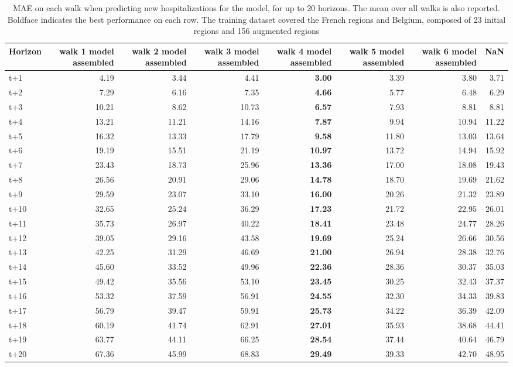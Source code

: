 \begin{table}[H]
\centering
\caption{MAE on each walk when predicting new hospitalizations for the model, for up to 20 horizons. The mean over all walks is also reported. Boldface indicates the best performance on each row. The training dataset covered the French regions and Belgium, composed of 23 initial regions and 156 augmented regions }
\label{tab:MAE_walk_assembly}
\begin{tabular}{lrrrrrrr}
\toprule
Horizon &  walk 1 model assembled &  walk 2 model assembled &  walk 3 model assembled &  walk 4 model assembled &  walk 5 model assembled &  walk 6 model assembled &   NaN \\
\midrule
t+1  & 4.19  & 3.44  & 4.41  & \textbf{3.00}  & 3.39  & 3.80  & 3.71  \\
t+2  & 7.29  & 6.16  & 7.35  & \textbf{4.66}  & 5.77  & 6.48  & 6.29  \\
t+3  & 10.21  & 8.62  & 10.73  & \textbf{6.57}  & 7.93  & 8.81  & 8.81  \\
t+4  & 13.21  & 11.21  & 14.16  & \textbf{7.87}  & 9.94  & 10.94  & 11.22  \\
t+5  & 16.32  & 13.33  & 17.79  & \textbf{9.58}  & 11.80  & 13.03  & 13.64  \\
t+6  & 19.19  & 15.51  & 21.19  & \textbf{10.97}  & 13.72  & 14.94  & 15.92  \\
t+7  & 23.43  & 18.73  & 25.96  & \textbf{13.36}  & 17.00  & 18.08  & 19.43  \\
t+8  & 26.56  & 20.91  & 29.06  & \textbf{14.78}  & 18.70  & 19.69  & 21.62  \\
t+9  & 29.59  & 23.07  & 33.10  & \textbf{16.00}  & 20.26  & 21.32  & 23.89  \\
t+10  & 32.65  & 25.24  & 36.29  & \textbf{17.23}  & 21.72  & 22.95  & 26.01  \\
t+11  & 35.73  & 26.97  & 40.22  & \textbf{18.41}  & 23.48  & 24.77  & 28.26  \\
t+12  & 39.05  & 29.16  & 43.58  & \textbf{19.69}  & 25.24  & 26.66  & 30.56  \\
t+13  & 42.25  & 31.29  & 46.69  & \textbf{21.00}  & 26.94  & 28.38  & 32.76  \\
t+14  & 45.60  & 33.52  & 49.96  & \textbf{22.36}  & 28.36  & 30.37  & 35.03  \\
t+15  & 49.42  & 35.56  & 53.10  & \textbf{23.45}  & 30.25  & 32.43  & 37.37  \\
t+16  & 53.32  & 37.59  & 56.91  & \textbf{24.55}  & 32.30  & 34.33  & 39.83  \\
t+17  & 56.79  & 39.47  & 59.91  & \textbf{25.73}  & 34.22  & 36.39  & 42.09  \\
t+18  & 60.19  & 41.74  & 62.91  & \textbf{27.01}  & 35.93  & 38.68  & 44.41  \\
t+19  & 63.77  & 44.11  & 66.25  & \textbf{28.54}  & 37.44  & 40.64  & 46.79  \\
t+20  & 67.36  & 45.99  & 68.83  & \textbf{29.49}  & 39.33  & 42.70  & 48.95  \\

\bottomrule
\end{tabular}
\end{table}
